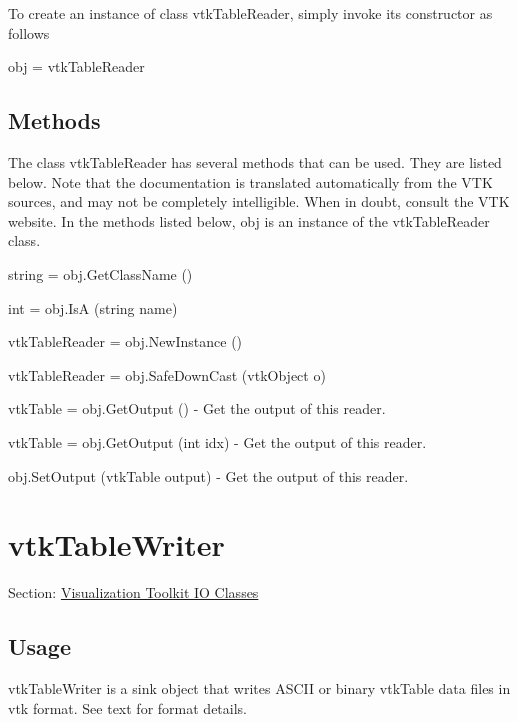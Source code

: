 To create an instance of class vtk\-Table\-Reader, simply invoke its constructor as follows \begin{DoxyVerb}  obj = vtkTableReader
\end{DoxyVerb}
 \hypertarget{vtkwidgets_vtkxyplotwidget_Methods}{}\subsection{Methods}\label{vtkwidgets_vtkxyplotwidget_Methods}
The class vtk\-Table\-Reader has several methods that can be used. They are listed below. Note that the documentation is translated automatically from the V\-T\-K sources, and may not be completely intelligible. When in doubt, consult the V\-T\-K website. In the methods listed below, {\ttfamily obj} is an instance of the vtk\-Table\-Reader class. 
\begin{DoxyItemize}
\item {\ttfamily string = obj.\-Get\-Class\-Name ()}  
\item {\ttfamily int = obj.\-Is\-A (string name)}  
\item {\ttfamily vtk\-Table\-Reader = obj.\-New\-Instance ()}  
\item {\ttfamily vtk\-Table\-Reader = obj.\-Safe\-Down\-Cast (vtk\-Object o)}  
\item {\ttfamily vtk\-Table = obj.\-Get\-Output ()} -\/ Get the output of this reader.  
\item {\ttfamily vtk\-Table = obj.\-Get\-Output (int idx)} -\/ Get the output of this reader.  
\item {\ttfamily obj.\-Set\-Output (vtk\-Table output)} -\/ Get the output of this reader.  
\end{DoxyItemize}\hypertarget{vtkio_vtktablewriter}{}\section{vtk\-Table\-Writer}\label{vtkio_vtktablewriter}
Section\-: \hyperlink{sec_vtkio}{Visualization Toolkit I\-O Classes} \hypertarget{vtkwidgets_vtkxyplotwidget_Usage}{}\subsection{Usage}\label{vtkwidgets_vtkxyplotwidget_Usage}
vtk\-Table\-Writer is a sink object that writes A\-S\-C\-I\-I or binary vtk\-Table data files in vtk format. See text for format details.

